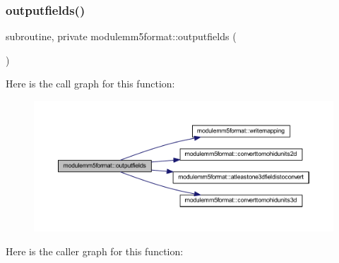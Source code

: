 \mbox{\label{namespacemodulemm5format_a3cfd45468121f8166d1e004ee05a5b0b}} 
\subsubsection{\texorpdfstring{outputfields()}{outputfields()}}
{\footnotesize\ttfamily subroutine, private modulemm5format\+::outputfields (\begin{DoxyParamCaption}{ }\end{DoxyParamCaption})\hspace{0.3cm}{\ttfamily [private]}}

Here is the call graph for this function\+:\nopagebreak
\begin{figure}[H]
\begin{center}
\leavevmode
\includegraphics[width=350pt]{namespacemodulemm5format_a3cfd45468121f8166d1e004ee05a5b0b_cgraph}
\end{center}
\end{figure}
Here is the caller graph for this function\+:\nopagebreak
